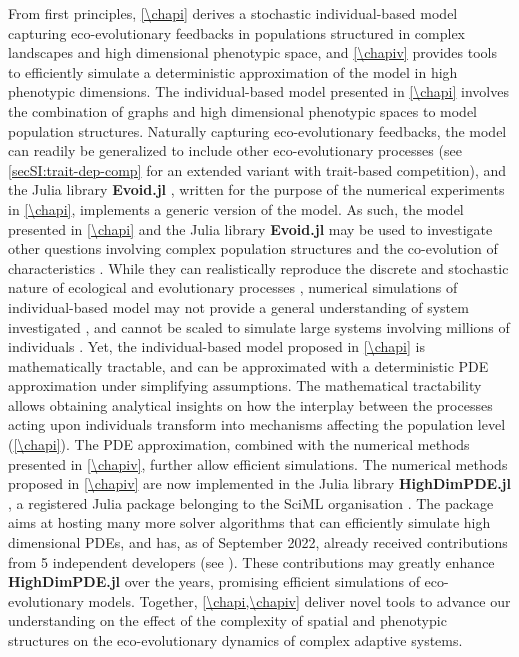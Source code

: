 From first principles, \cref{\chapi} derives a stochastic individual-based model capturing eco-evolutionary feedbacks in populations structured in complex landscapes and high dimensional phenotypic space, and \cref{\chapiv} provides tools to efficiently simulate a deterministic approximation of the model in high phenotypic dimensions.
% 
The individual-based model presented in \cref{\chapi} involves the combination of graphs and high dimensional phenotypic spaces to model population structures. Naturally capturing eco-evolutionary feedbacks, the model can readily be generalized to include other eco-evolutionary processes (see \cref{secSI:trait-dep-comp} for an extended variant with trait-based competition), and the Julia library \textbf{Evoid.jl} \cite{Evoid.jl}, written for the purpose of the numerical experiments in \cref{\chapi}, implements a generic version of the model. %
% 
As such, the model presented in \cref{\chapi} and the Julia library \textbf{Evoid.jl} may be used to investigate other questions involving complex population structures \citep{LiebermanHauert2005} and the co-evolution of characteristics \citep{Doebeli2011}.
% 
While they can realistically reproduce the discrete and stochastic nature of ecological and evolutionary processes \citep{Champagnat2006}, numerical simulations of individual-based model may not provide a general understanding of system investigated \citep{Lion2016,Hodgson2019}, and cannot be scaled to simulate large systems involving millions of individuals \citep{deangelis2005individual}. Yet, the individual-based model proposed in \cref{\chapi} is mathematically tractable, and can be approximated with a deterministic PDE approximation under simplifying assumptions.
% 
The mathematical tractability allows obtaining analytical insights on how the interplay between the processes acting upon individuals transform into mechanisms affecting the population level (\cref{\chapi}).
% 
The PDE approximation, combined with the numerical methods presented in \cref{\chapiv}, further allow efficient simulations. 
% 
The numerical methods proposed in \cref{\chapiv} are now implemented in the Julia library \textbf{HighDimPDE.jl} \citep{HighDimPDE}, a registered Julia package belonging to the SciML organisation \citep{SciML}.
%
The package aims at hosting many more solver algorithms that can efficiently simulate high dimensional PDEs, and has, as of September 2022, already received contributions from 5 independent developers (see \cite{contribHighDimPDE}). These contributions may greatly enhance \textbf{HighDimPDE.jl} over the years, promising efficient simulations of eco-evolutionary models.
% 
% 
Together, \cref{\chapi,\chapiv} deliver novel tools to advance our understanding on the effect of the complexity of spatial and phenotypic structures on the eco-evolutionary dynamics of complex adaptive systems.


